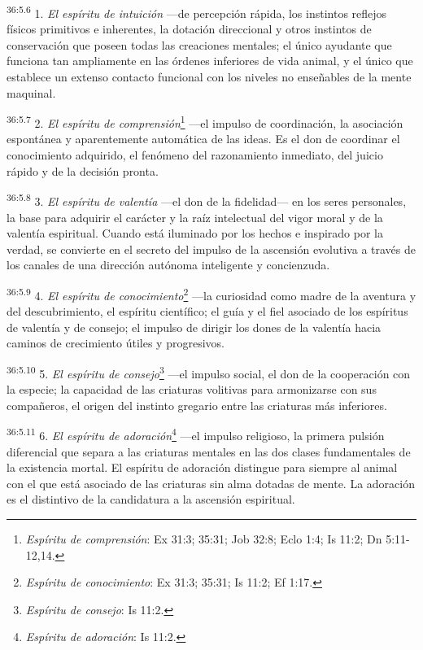 \par
\textsuperscript{36:5.6} 1. \textit{El espíritu de intuición} ---de percepción rápida, los instintos reflejos físicos primitivos e inherentes, la dotación direccional y otros instintos de conservación que poseen todas las creaciones mentales; el único ayudante que funciona tan ampliamente en las órdenes inferiores de vida animal, y el único que establece un extenso contacto funcional con los niveles no enseñables de la mente maquinal.

\par
\textsuperscript{36:5.7} 2. \textit{El espíritu de comprensión}\footnote{\textit{Espíritu de comprensión}: Ex 31:3; 35:31; Job 32:8; Eclo 1:4; Is 11:2; Dn 5:11-12,14.} ---el impulso de coordinación, la asociación espontánea y aparentemente automática de las ideas. Es el don de coordinar el conocimiento adquirido, el fenómeno del razonamiento inmediato, del juicio rápido y de la decisión pronta.

\par
\textsuperscript{36:5.8} 3. \textit{El espíritu de valentía} ---el don de la fidelidad--- en los seres personales, la base para adquirir el carácter y la raíz intelectual del vigor moral y de la valentía espiritual. Cuando está iluminado por los hechos e inspirado por la verdad, se convierte en el secreto del impulso de la ascensión evolutiva a través de los canales de una dirección autónoma inteligente y concienzuda.

\par
\textsuperscript{36:5.9} 4. \textit{El espíritu de conocimiento}\footnote{\textit{Espíritu de conocimiento}: Ex 31:3; 35:31; Is 11:2; Ef 1:17.} ---la curiosidad como madre de la aventura y del descubrimiento, el espíritu científico; el guía y el fiel asociado de los espíritus de valentía y de consejo; el impulso de dirigir los dones de la valentía hacia caminos de crecimiento útiles y progresivos.

\par
\textsuperscript{36:5.10} 5. \textit{El espíritu de consejo}\footnote{\textit{Espíritu de consejo}: Is 11:2.} ---el impulso social, el don de la cooperación con la especie; la capacidad de las criaturas volitivas para armonizarse con sus compañeros, el origen del instinto gregario entre las criaturas más inferiores.

\par
\textsuperscript{36:5.11} 6. \textit{El espíritu de adoración}\footnote{\textit{Espíritu de adoración}: Is 11:2.} ---el impulso religioso, la primera pulsión diferencial que separa a las criaturas mentales en las dos clases fundamentales de la existencia mortal. El espíritu de adoración distingue para siempre al animal con el que está asociado de las criaturas sin alma dotadas de mente. La adoración es el distintivo de la candidatura a la ascensión espiritual.


